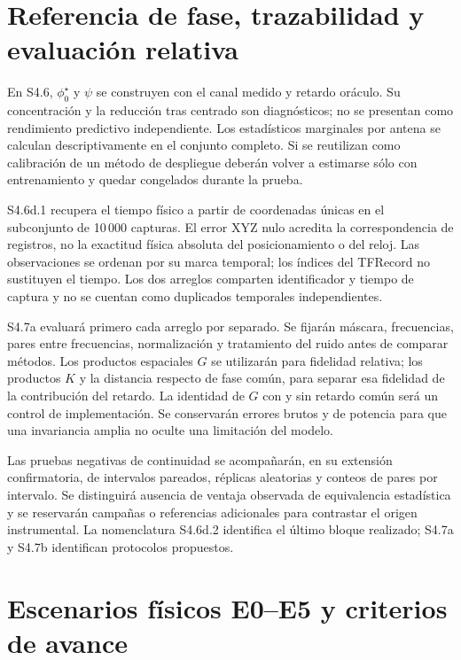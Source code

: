 \section{Referencia de fase, trazabilidad y evaluación relativa}

En S4.6, $\phi_0^\star$ y $\psi$ se construyen con el canal medido y retardo
oráculo. Su concentración y la reducción tras centrado son diagnósticos;
no se presentan como rendimiento predictivo independiente. Los estadísticos
marginales por antena se calculan descriptivamente en el conjunto completo.
Si se reutilizan como calibración de un método de despliegue deberán volver
a estimarse sólo con entrenamiento y quedar congelados durante la prueba.

S4.6d.1 recupera el tiempo físico a partir de coordenadas únicas en el
subconjunto de 10\,000 capturas. El error XYZ nulo acredita la correspondencia
de registros, no la exactitud física absoluta del posicionamiento o del reloj.
Las observaciones se ordenan por su marca temporal; los índices del TFRecord
no sustituyen el tiempo. Los dos arreglos comparten identificador y tiempo de
captura y no se cuentan como duplicados temporales independientes.

S4.7a evaluará primero cada arreglo por separado. Se fijarán máscara, frecuencias,
pares entre frecuencias, normalización y tratamiento del ruido antes de comparar
métodos. Los productos espaciales $G$ se utilizarán para fidelidad relativa;
los productos $K$ y la distancia respecto de fase común, para separar esa
fidelidad de la contribución del retardo. La identidad de $G$ con y sin retardo
común será un control de implementación. Se conservarán errores brutos y de
potencia para que una invariancia amplia no oculte una limitación del modelo.

Las pruebas negativas de continuidad se acompañarán, en su extensión
confirmatoria, de intervalos pareados, réplicas aleatorias y conteos de pares
por intervalo. Se distinguirá ausencia de ventaja observada de equivalencia
estadística y se reservarán campañas o referencias adicionales para contrastar
el origen instrumental. La nomenclatura S4.6d.2 identifica el último bloque
realizado; S4.7a y S4.7b identifican protocolos propuestos.


\section{Escenarios físicos E0--E5 y criterios de avance}
\label{sec:physical_scenarios}

